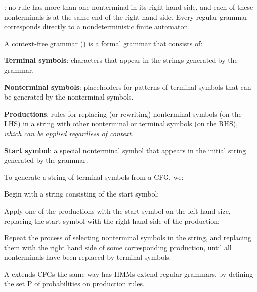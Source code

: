 \documentclass[11pt]{article}
\begin{document}
\begin{compactitem}
	\item {}: no rule has more than one nonterminal in its right-hand side, and each of these nonterminals is at the same end of the right-hand side. Every regular grammar corresponds directly to a nondeterministic finite automaton. 
	
	\item A \href{https://www.cs.rochester.edu/~nelson/courses/csc_173/grammars/cfg.html}{context-free grammar} () is a formal grammar that consists of:
	\begin{footnotesize}
	\begin{compactitem}
		\item \textbf{Terminal symbols}: characters that appear in the strings generated by the grammar.
		\item \textbf{Nonterminal symbols}: placeholders for patterns of terminal symbols that can be generated by the nonterminal symbols.
		\item \textbf{Productions}: rules for replacing (or rewriting) nonterminal symbols (on the LHS) in a string with other nonterminal or terminal symbols (on the RHS), \textit{which can be applied regardless of context}. 
		\item \textbf{Start symbol}: a special nonterminal symbol that appears in the initial string generated by the grammar.
	\end{compactitem}
	\end{footnotesize}
	To generate a string of terminal symbols from a CFG, we:
	\begin{footnotesize}
	\begin{compactenum}
		\item Begin with a string consisting of the start symbol;
		\item Apply one of the productions with the start symbol on the left hand size, replacing the start symbol with the right hand side of the production;
		\item Repeat the process of selecting nonterminal symbols in the string, and replacing them with the right hand side of some corresponding production, until all nonterminals have been replaced by terminal symbols.
	\end{compactenum}
	\end{footnotesize}

	\item A  extends CFGs the same way has HMMs extend regular grammars, by defining the set P of probabilities on production rules. 
\end{compactitem}	
\end{document}
